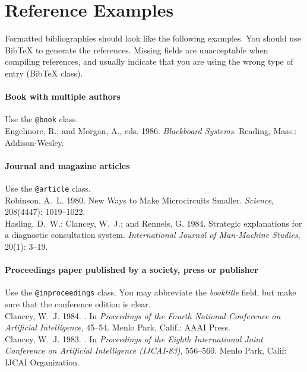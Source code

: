 \appendix
\section{Reference Examples}
\label{sec:reference_examples}

Formatted bibliographies should look like the following examples. You should use BibTeX to generate the references. Missing fields are unacceptable when compiling references, and usually indicate that you are using the wrong type of entry (BibTeX class).

\paragraph{Book with multiple authors} Use the \texttt{@book} class.\\[.2em]
\nocite{em:86}
Engelmore, R.; and Morgan, A., eds. 1986.
\newblock \emph{Blackboard Systems}.
\newblock Reading, Mass.: Addison-Wesley.

\paragraph{Journal and magazine articles} Use the \texttt{@article} class.\\[.2em]
\nocite{r:80}
Robinson, A.~L. 1980.
\newblock New Ways to Make Microcircuits Smaller.
\newblock \emph{Science}, 208(4447): 1019--1022.\\[.2em]
\nocite{hcr:83}
Hasling, D.~W.; Clancey, W.~J.; and Rennels, G. 1984.
\newblock Strategic explanations for a diagnostic consultation system.
\newblock \emph{International Journal of Man-Machine Studies}, 20(1): 3--19.

\paragraph{Proceedings paper published by a society, press or publisher} Use the \texttt{@inproceedings} class. You may abbreviate the \emph{booktitle} field, but make sure that the conference edition is clear.\\[.2em]
\nocite{c:84}
Clancey, W.~J. 1984.
.
\newblock In \emph{Proceedings of the Fourth National Conference on Artificial
  Intelligence}, 45--54. Menlo Park, Calif.: AAAI Press.\\[.2em]
\nocite{c:83}
Clancey, W.~J. 1983.
.
\newblock In \emph{Proceedings of the Eighth International Joint Conference on
  Artificial Intelligence {(IJCAI-83)}}, 556--560. Menlo Park, Calif: {IJCAI
  Organization}.

